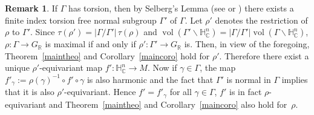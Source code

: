 \documentclass[10pt]{amsart}
\newcommand{\citestar}[3]{\cite[#3]{#1}}
\theoremstyle{plain}
\theoremstyle{definition}
\newtheorem{rema}[theo]{Remark}
\DeclareMathOperator{\vol}{vol}
\newcommand{\bR}{\mathbb{R}}
\newcommand{\HC}{{\mathbb{H}^n_\mathbb{C}}}
\begin{document}
\begin{rema}\label{rema:torsion}
If $\Gamma$ has torsion, then by
Selberg's Lemma (see \citestar{ratcliffe}*{p.\,327} or \cite{selberg}) there exists a finite index
torsion free normal subgroup $\Gamma'$ of $\Gamma$. Let $\rho'$ denotes the
restriction of $\rho$ to $\Gamma'$. Since $\tau(\rho') = |\Gamma/\Gamma'|\, \tau(\rho)$ and
$\vol(\Gamma'\backslash\HC)=|\Gamma/\Gamma'|\vol(\Gamma\backslash\HC)$, $\rho:\Gamma\to G_\bR$ is
maximal if and only if $\rho':\Gamma'\to G_\bR$ is. Then, in view of the foregoing,
Theorem~\ref{maintheo} and Corollary~\ref{maincoro} hold for $\rho'$. Therefore there exist a unique
$\rho'$-equivariant map $f':\HC\to M$. Now if $\gamma\in\Gamma$, the map $f'_\gamma:=\rho(\gamma)^{-1}\circ f'\circ\gamma$ is
also harmonic and the fact that $\Gamma'$ is normal in $\Gamma$ implies that it is also
$\rho'$-equivariant.
Hence $f'=f'_\gamma$ for all $\gamma\in\Gamma$, \ie $f'$ is in fact
$\rho$-equivariant and Theorem~\ref{maintheo} and Corollary~\ref{maincoro} also hold for~$\rho$.
\end{rema}
\egroup
\end{document}
